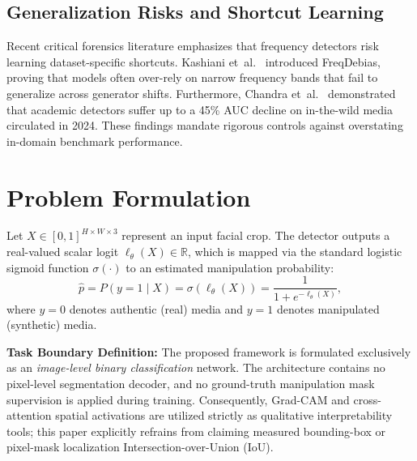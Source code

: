 \documentclass[11pt,a4paper]{article}
\begin{document}
\subsection{Generalization Risks and Shortcut Learning}
Recent critical forensics literature emphasizes that frequency detectors risk learning dataset-specific shortcuts. Kashiani et~al.~\cite{kashiani2025freqdebias} introduced FreqDebias, proving that models often over-rely on narrow frequency bands that fail to generalize across generator shifts. Furthermore, Chandra et~al.~\cite{chandra2024deepfakeeval} demonstrated that academic detectors suffer up to a 45\% AUC decline on in-the-wild media circulated in 2024. These findings mandate rigorous controls against overstating in-domain benchmark performance.

\section{Problem Formulation}
\label{sec:problem}

Let $X \in [0, 1]^{H \times W \times 3}$ represent an input facial crop. The detector outputs a real-valued scalar logit $\ell_\theta(X) \in \mathbb{R}$, which is mapped via the standard logistic sigmoid function $\sigma(\cdot)$ to an estimated manipulation probability:
\begin{equation}
\hat{p} = P(y = 1 \mid X) = \sigma(\ell_\theta(X)) = \frac{1}{1 + e^{-\ell_\theta(X)}},
\end{equation}
where $y = 0$ denotes authentic (real) media and $y = 1$ denotes manipulated (synthetic) media. 

\textbf{Task Boundary Definition:} The proposed framework is formulated exclusively as an \textit{image-level binary classification} network. The architecture contains no pixel-level segmentation decoder, and no ground-truth manipulation mask supervision is applied during training. Consequently, Grad-CAM and cross-attention spatial activations are utilized strictly as qualitative interpretability tools; this paper explicitly refrains from claiming measured bounding-box or pixel-mask localization Intersection-over-Union (IoU).

\end{document}
